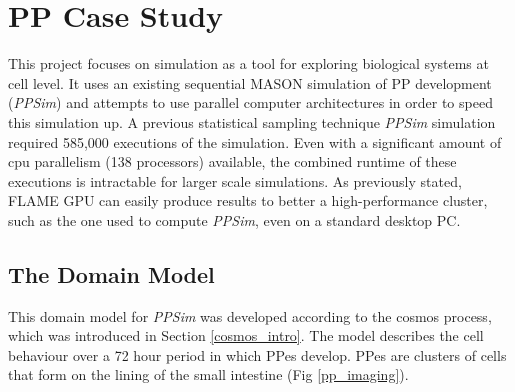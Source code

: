 \documentclass{UoYCSproject}
\begin{document}
\section{\gls{PP} Case Study}
\label{ppsim}
This project focuses on simulation as a tool for exploring biological systems at cell level.
It uses an existing sequential \gls{MASON} simulation of \gls{PP} development\cite{kieran_thesis, kieran_methodology, kieran_results, kieran_machine_learning, spartan} (\textit{PPSim}) and attempts to use parallel computer architectures in order to speed this simulation up.
A previous statistical sampling technique \textit{PPSim} simulation required 585,000 executions of the simulation.
Even with a significant amount of \gls{cpu} parallelism (138 processors) available, the combined runtime of these executions is intractable for larger scale simulations.\cite{kieran_machine_learning}
As previously stated, \gls{FLAME GPU} can easily produce results to better a high-performance cluster, such as the one used to compute \textit{PPSim}, even on a standard desktop PC.

\subsection{The Domain Model}
This domain model for \textit{PPSim} was developed according to the \acrshort{cosmos} process\cite{cosmos}, which was introduced in Section \ref{cosmos_intro}.
The model describes the cell behaviour over a 72 hour period in which \gls{PP}es develop.
\gls{PP}es are clusters of cells that form on the lining of the small intestine (Fig \ref{pp_imaging}).
\end{document}
